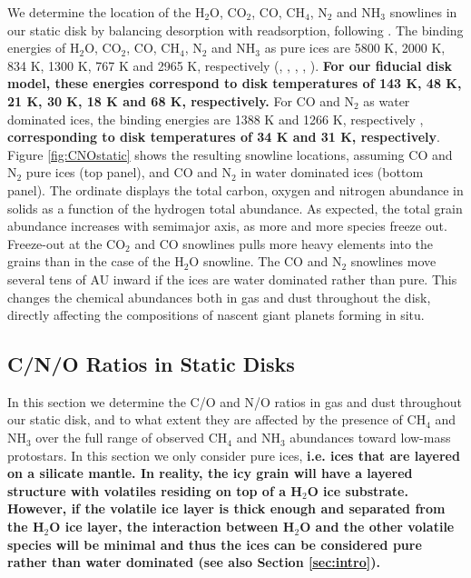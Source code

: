 \documentclass[apj]{emulateapj}
\begin{document}
We determine the location of the H$_2$O, CO$_2$, CO, CH$_4$, N$_2$ and NH$_3$ snowlines in our static disk by balancing desorption with readsorption, following \citet{hollenbach09}. The binding energies of H$_2$O, CO$_2$, CO, CH$_4$, N$_2$ and NH$_3$ as pure ices are 5800 K, 2000 K, 834 K, 1300 K, 767 K and 2965 K, respectively (\citealt{fraser01}, \citealt{collings04}, \citealt{fayolle16}, \citealt{garrod06}, \citealt{martin14}). \textbf{For our fiducial disk model, these energies correspond to disk temperatures of 143 K, 48 K, 21 K, 30 K, 18 K and 68 K, respectively.} For CO and N$_2$ as water dominated ices, the binding energies are 1388 K and 1266 K, respectively \citep{fayolle16}, \textbf{corresponding to disk temperatures of 34 K and 31 K, respectively}. Figure \ref{fig:CNOstatic} shows the resulting snowline locations, assuming CO and N$_2$ pure ices (top panel), and CO and N$_2$ in water dominated ices (bottom panel). The ordinate displays the total carbon, oxygen and nitrogen abundance in solids as a function of the hydrogen total abundance.  As expected, the total grain abundance increases with semimajor axis, as more and more species freeze out. Freeze-out at the CO$_2$ and CO snowlines pulls more heavy elements into the grains than in the case of the H$_2$O snowline.  The CO and N$_2$ snowlines move several tens of AU inward if the ices are water dominated rather than pure. This changes the chemical abundances both in gas and dust throughout the disk, directly affecting the compositions of nascent giant planets forming in situ. %


\subsection{C/N/O Ratios in Static Disks}
\label{sec:static}

In this section we determine the C/O and N/O ratios in gas and dust throughout our static disk, and to what extent they are affected by the presence of CH$_4$ and NH$_3$ over the full range of observed CH$_4$ and NH$_3$ abundances toward low-mass protostars. In this section we only consider pure ices, \textbf{i.e. ices that are layered on a silicate mantle. In reality, the icy grain will have a layered structure with volatiles residing on top of a H$_2$O ice substrate. However, if the volatile ice layer is thick enough and separated from the H$_2$O ice layer, the interaction between H$_2$O and the other volatile species will be minimal and thus the ices can be considered pure rather than water dominated (see also Section \ref{sec:intro}).}
\end{document}
